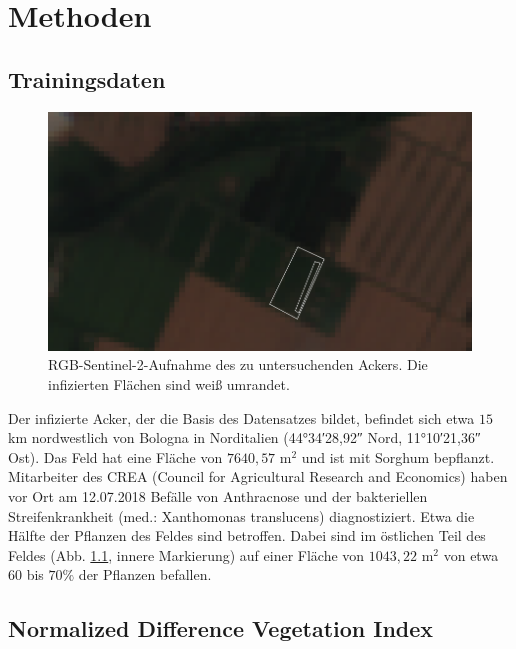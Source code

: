 \chapter{Methoden}\label{chap:methods}



\section{Trainingsdaten}\label{sec:data}
\begin{figure}[ht]
  \centering
  \includegraphics[width=.7\textwidth]{pics/roi.png}
  \caption[Region of Interest]{RGB-Sentinel-2-Aufnahme des zu untersuchenden Ackers. Die infizierten Flächen sind weiß umrandet. }
  \label{fig:roi}
\end{figure}
\noindent
Der infizierte Acker, der die Basis des Datensatzes bildet, befindet sich etwa $15$ km nordwestlich von Bologna in Norditalien (\ang{44;34;28,92} Nord, \ang{11;10;21,36} Ost). Das Feld hat eine Fläche von $7640,57$ m$^2$ und ist mit Sorghum bepflanzt. Mitarbeiter des CREA (Council for Agricultural Research and Economics) haben vor Ort am 12.07.2018 Befälle von Anthracnose und der bakteriellen Streifenkrankheit (med.: Xanthomonas translucens) diagnostiziert. Etwa die Hälfte der Pflanzen des Feldes sind betroffen. Dabei sind im östlichen Teil des Feldes (Abb. \ref{fig:roi}, innere Markierung) auf einer Fläche von $1043,22$ m$^2$ von etwa $60$ bis $70\%$ der Pflanzen befallen.

\section{Normalized Difference Vegetation Index}\label{sec:ndvi}

